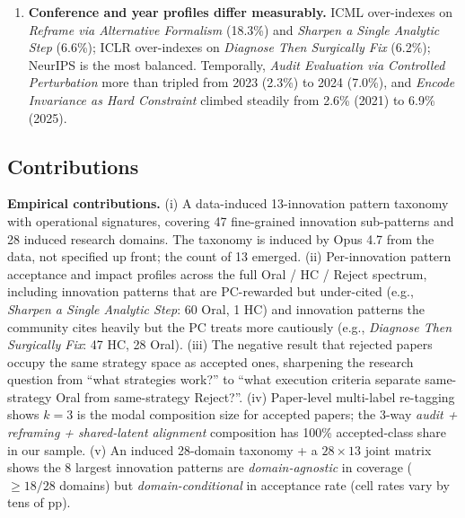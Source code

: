 \documentclass[10pt,a4paper]{article}
\begin{document}
\begin{enumerate}[leftmargin=1.5em]
\item \textbf{Conference and year profiles differ measurably.} ICML over-indexes on \emph{Reframe via Alternative Formalism} (18.3\%) and \emph{Sharpen a Single Analytic Step} (6.6\%); ICLR over-indexes on \emph{Diagnose Then Surgically Fix} (6.2\%); NeurIPS is the most balanced. Temporally, \emph{Audit Evaluation via Controlled Perturbation} more than tripled from 2023 (2.3\%) to 2024 (7.0\%), and \emph{Encode Invariance as Hard Constraint} climbed steadily from 2.6\% (2021) to 6.9\% (2025).
\end{enumerate}

\subsection{Contributions}

\textbf{Empirical contributions.}
(i) A data-induced 13-innovation pattern taxonomy with operational signatures, covering 47 fine-grained innovation sub-patterns and 28 induced research domains. The taxonomy is induced by Opus 4.7 from the data, not specified up front; the count of 13 emerged.
(ii) Per-innovation pattern acceptance and impact profiles across the full Oral / HC / Reject spectrum, including innovation patterns that are PC-rewarded but under-cited (e.g., \emph{Sharpen a Single Analytic Step}: 60 Oral, 1 HC) and innovation patterns the community cites heavily but the PC treats more cautiously (e.g., \emph{Diagnose Then Surgically Fix}: 47 HC, 28 Oral).
(iii) The negative result that rejected papers occupy the same strategy space as accepted ones, sharpening the research question from ``what strategies work?'' to ``what execution criteria separate same-strategy Oral from same-strategy Reject?''.
(iv) Paper-level multi-label re-tagging shows \(k{=}3\) is the modal composition size for accepted papers; the 3-way \emph{audit + reframing + shared-latent alignment} composition has 100\% accepted-class share in our sample.
(v) An induced 28-domain taxonomy + a \(28{\times}13\) joint matrix shows the 8 largest innovation patterns are \emph{domain-agnostic} in coverage (\(\geq 18/28\) domains) but \emph{domain-conditional} in acceptance rate (cell rates vary by tens of pp).
\end{document}

